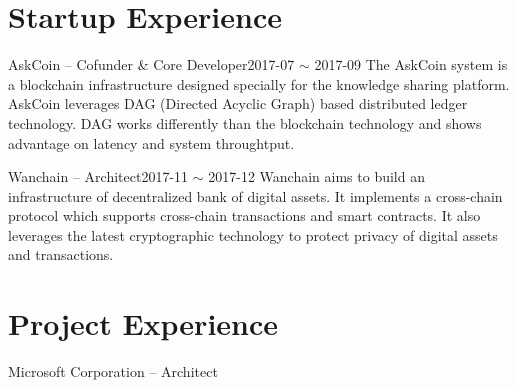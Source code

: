\documentclass[10pt,a4paper]{moderncv}
\begin{document}
\vspace*{0.4\baselineskip}

\section{Startup Experience}
\vspace*{0.2\baselineskip}
	{ AskCoin -- Cofunder \& Core Developer}{2017-07 $\sim$ 2017-09}{}{}
	{The AskCoin system is a blockchain infrastructure designed specially for the knowledge sharing platform. AskCoin leverages DAG (Directed Acyclic Graph) based distributed ledger technology. DAG works differently than the blockchain technology and shows advantage on latency and system throughtput.}
\vspace{1ex}

	{Wanchain -- Architect}{2017-11 $\sim$ 2017-12}{}{}
	{Wanchain aims to build an infrastructure of decentralized bank of digital assets. It implements a cross-chain protocol which supports cross-chain transactions and smart contracts. It also leverages the latest cryptographic technology to protect privacy of digital assets and transactions.}
\vspace{1ex}

\vspace*{0.4\baselineskip}

\section{Project Experience}
\vspace{2ex}

	{ Microsoft Corporation -- Architect}{}{}{}{}
\end{document}
